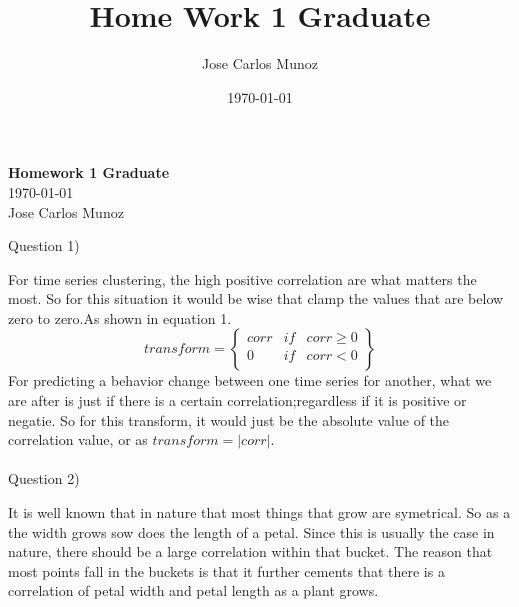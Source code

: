 \documentclass[12pt,english]{article}
\title{Home Work 1 Graduate}
\date{\today}
\author{Jose Carlos Munoz}
\begin{document}
\begin{center}
    \Large
    \textbf{Homework 1 Graduate}\\
    \small
    \today\\
    \large
    Jose Carlos Munoz
\end{center}
Question 1)\par
For time series clustering, the high positive correlation are what matters the most. So for this situation it would be wise that clamp the values that are below zero to zero.As shown in equation 1.
\begin{equation}
transform =
\begin{Bmatrix} corr &if &corr \geq 0  \\  0     & if & corr < 0  \\  \end{Bmatrix}
\end{equation}
For predicting a behavior change between one time series for another, what we are after is just if there is a certain correlation;regardless if it is positive or negatie. So for this transform, it would just be the absolute value of the correlation value, or as $transform =|corr|$.
\\
\\
Question 2)\par
It is well known that in nature that most things that grow are symetrical. So as a the width grows sow does the length of a petal. Since this is usually the case in nature, there should be a large correlation within that bucket. The reason that most points fall in the buckets is that it further cements that there is a correlation of petal width and petal length as a plant grows.
\end{document}
